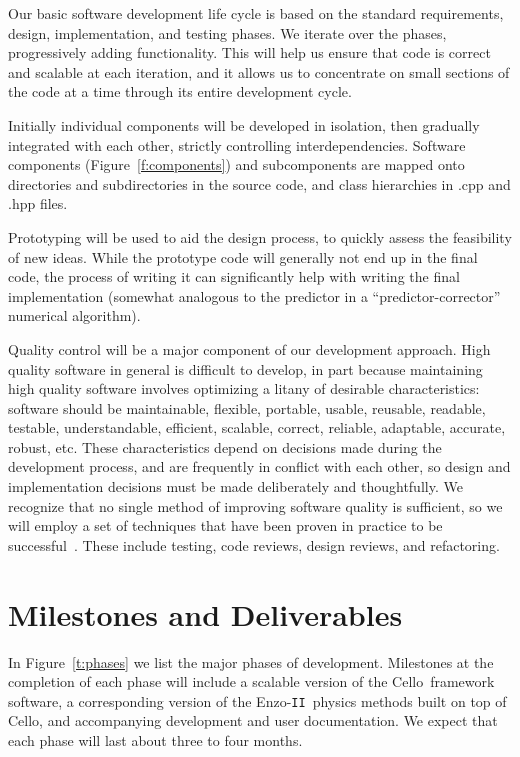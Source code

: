 \documentclass[11pt,letterpaper]{article}
\newcommand{\cello}{\textsf{Cello}}
\newcommand{\enzoii}{\textsf{Enzo}-\texttt{II}}
\begin{document}
Our basic software development life cycle is based on the standard
requirements, design, implementation, and testing phases.  We iterate
over the phases, progressively adding functionality.  This will help
us ensure that code is correct and scalable at each iteration, and it
allows us to concentrate on small sections of the code at a time
through its entire development cycle.  

Initially individual components will be developed in isolation, then
gradually integrated with each other, strictly controlling
interdependencies.  Software components (Figure~\ref{f:components})
and subcomponents are mapped onto directories and subdirectories in
the source code, and class hierarchies in .cpp and .hpp files.

Prototyping will be used to aid the design process, to quickly assess
the feasibility of new ideas.  While the prototype code will generally
not end up in the final code, the process of writing it can
significantly help with writing the final implementation (somewhat
analogous to the predictor in a ``predictor-corrector'' numerical
algorithm).

Quality control will be a major component of our development approach.
High quality software in general is difficult to develop, in part
because maintaining high quality software involves optimizing a litany
of desirable characteristics: software should be maintainable,
flexible, portable, usable, reusable, readable, testable,
understandable, efficient, scalable, correct, reliable, adaptable,
accurate, robust, etc.  These characteristics depend on decisions made
during the development process, and are frequently in conflict with
each other, so design and implementation decisions must be made
deliberately and thoughtfully.  We recognize that no single method of
improving software quality is sufficient, so we will employ a set of
techniques that have been proven in practice to be
successful~\cite{Mc04}.  These include testing, code reviews, design
reviews, and refactoring.



\section{Milestones and Deliverables} \label{s:milestones}

In Figure~\ref{t:phases} we list the major phases of development.
Milestones at the completion of each phase will include a scalable
version of the \cello\ framework software, a corresponding version of
the \enzoii\ physics methods built on top of \cello, and accompanying
development and user documentation.  We expect that each phase will
last about three to four months.
\end{document}
